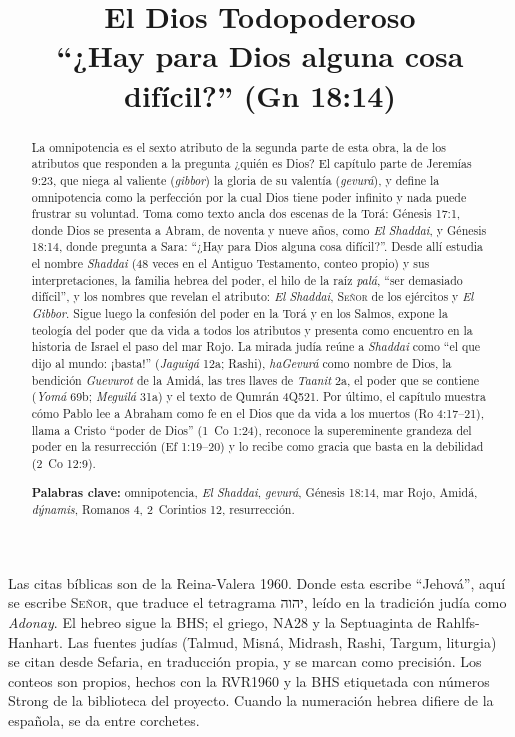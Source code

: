 \documentclass[11pt,letterpaper]{article}
\title{\color{azul}\bfseries El Dios Todopoderoso\\[4pt]\large\color{gris}\mdseries ``¿Hay para Dios alguna cosa difícil?'' (Gn 18:14)}
\author{}\date{}
\newcommand{\heb}[1]{\mbox{\foreignlanguage{hebrew}{#1}}}
\newcommand{\SENOR}{\textsc{Señor}}
\begin{document}
\maketitle\thispagestyle{empty}

\begin{abstract}\noindent
La omnipotencia es el sexto atributo de la segunda parte de esta obra, la de los atributos que responden a la pregunta ¿quién es Dios? El capítulo parte de Jeremías 9:23, que niega al valiente (\emph{gibbor}) la gloria de su valentía (\emph{gevurá}), y define la omnipotencia como la perfección por la cual Dios tiene poder infinito y nada puede frustrar su voluntad. Toma como texto ancla dos escenas de la Torá: Génesis 17:1, donde Dios se presenta a Abram, de noventa y nueve años, como \emph{El Shaddai}, y Génesis 18:14, donde pregunta a Sara: ``¿Hay para Dios alguna cosa difícil?''. Desde allí estudia el nombre \emph{Shaddai} (48 veces en el Antiguo Testamento, conteo propio) y sus interpretaciones, la familia hebrea del poder, el hilo de la raíz \emph{palá}, ``ser demasiado difícil'', y los nombres que revelan el atributo: \emph{El Shaddai}, \SENOR{} de los ejércitos y \emph{El Gibbor}. Sigue luego la confesión del poder en la Torá y en los Salmos, expone la teología del poder que da vida a todos los atributos y presenta como encuentro en la historia de Israel el paso del mar Rojo. La mirada judía reúne a \emph{Shaddai} como ``el que dijo al mundo: ¡basta!'' (\emph{Jaguigá} 12a; Rashi), \emph{haGevurá} como nombre de Dios, la bendición \emph{Guevurot} de la Amidá, las tres llaves de \emph{Taanit} 2a, el poder que se contiene (\emph{Yomá} 69b; \emph{Meguilá} 31a) y el texto de Qumrán 4Q521. Por último, el capítulo muestra cómo Pablo lee a Abraham como fe en el Dios que da vida a los muertos (Ro 4:17--21), llama a Cristo ``poder de Dios'' (1~Co 1:24), reconoce la supereminente grandeza del poder en la resurrección (Ef 1:19--20) y lo recibe como gracia que basta en la debilidad (2~Co 12:9).
\par\smallskip\noindent\textbf{Palabras clave:} omnipotencia, \emph{El Shaddai}, \emph{gevurá}, Génesis 18:14, mar Rojo, Amidá, \emph{dýnamis}, Romanos 4, 2~Corintios 12, resurrección.\end{abstract}

\begin{nota}
Las citas bíblicas son de la Reina-Valera 1960. Donde esta escribe ``Jehová'', aquí se escribe \SENOR, que traduce el tetragrama \heb{יהוה}, leído en la tradición judía como \emph{Adonay}. El hebreo sigue la BHS; el griego, NA28 y la Septuaginta de Rahlfs-Hanhart. Las fuentes judías (Talmud, Misná, Midrash, Rashi, Targum, liturgia) se citan desde Sefaria, en traducción propia, y se marcan como precisión. Los conteos son propios, hechos con la RVR1960 y la BHS etiquetada con números Strong de la biblioteca del proyecto. Cuando la numeración hebrea difiere de la española, se da entre corchetes.
\end{nota}
\end{document}
